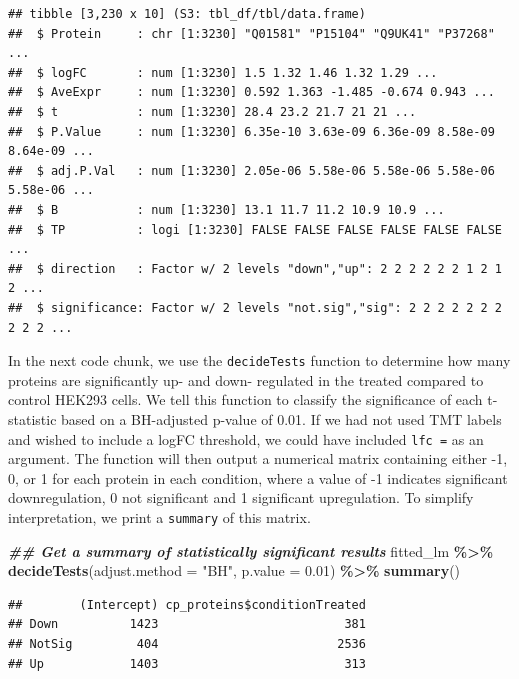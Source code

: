 \documentclass[9pt,a4paper,]{extarticle}
\newenvironment{Shaded}{\begin{snugshade}}{\end{snugshade}}
\newcommand{\AttributeTok}[1]{\textcolor[rgb]{0.13,0.29,0.53}{#1}}
\newcommand{\DocumentationTok}[1]{\textcolor[rgb]{0.56,0.35,0.01}{\textbf{\textit{#1}}}}
\newcommand{\FloatTok}[1]{\textcolor[rgb]{0.00,0.00,0.81}{#1}}
\newcommand{\FunctionTok}[1]{\textcolor[rgb]{0.13,0.29,0.53}{\textbf{#1}}}
\newcommand{\NormalTok}[1]{#1}
\newcommand{\SpecialCharTok}[1]{\textcolor[rgb]{0.81,0.36,0.00}{\textbf{#1}}}
\newcommand{\StringTok}[1]{\textcolor[rgb]{0.31,0.60,0.02}{#1}}
\begin{document}
\begin{verbatim}
## tibble [3,230 x 10] (S3: tbl_df/tbl/data.frame)
##  $ Protein     : chr [1:3230] "Q01581" "P15104" "Q9UK41" "P37268" ...
##  $ logFC       : num [1:3230] 1.5 1.32 1.46 1.32 1.29 ...
##  $ AveExpr     : num [1:3230] 0.592 1.363 -1.485 -0.674 0.943 ...
##  $ t           : num [1:3230] 28.4 23.2 21.7 21 21 ...
##  $ P.Value     : num [1:3230] 6.35e-10 3.63e-09 6.36e-09 8.58e-09 8.64e-09 ...
##  $ adj.P.Val   : num [1:3230] 2.05e-06 5.58e-06 5.58e-06 5.58e-06 5.58e-06 ...
##  $ B           : num [1:3230] 13.1 11.7 11.2 10.9 10.9 ...
##  $ TP          : logi [1:3230] FALSE FALSE FALSE FALSE FALSE FALSE ...
##  $ direction   : Factor w/ 2 levels "down","up": 2 2 2 2 2 2 1 2 1 2 ...
##  $ significance: Factor w/ 2 levels "not.sig","sig": 2 2 2 2 2 2 2 2 2 2 ...
\end{verbatim}

In the next code chunk, we use the \texttt{decideTests} function to determine how many
proteins are significantly up- and down- regulated in the treated compared to control
HEK293 cells. We tell this function to classify the significance of each
t-statistic based on a BH-adjusted p-value of 0.01. If we had not used TMT
labels and wished to include a logFC threshold, we could have included \texttt{lfc\ =}
as an argument. The function will then output a numerical matrix containing
either -1, 0, or 1 for each protein in each condition, where a value of -1
indicates significant downregulation, 0 not significant and 1 significant
upregulation. To simplify interpretation, we print a \texttt{summary} of this matrix.

\begin{Shaded}
\begin{Highlighting}[]
\DocumentationTok{\#\# Get a summary of statistically significant results}
\NormalTok{fitted\_lm }\SpecialCharTok{\%\textgreater{}\%}
  \FunctionTok{decideTests}\NormalTok{(}\AttributeTok{adjust.method =} \StringTok{"BH"}\NormalTok{,}
              \AttributeTok{p.value =} \FloatTok{0.01}\NormalTok{) }\SpecialCharTok{\%\textgreater{}\%}
  \FunctionTok{summary}\NormalTok{()}
\end{Highlighting}
\end{Shaded}

\begin{verbatim}
##        (Intercept) cp_proteins$conditionTreated
## Down          1423                          381
## NotSig         404                         2536
## Up            1403                          313
\end{verbatim}
\end{document}
